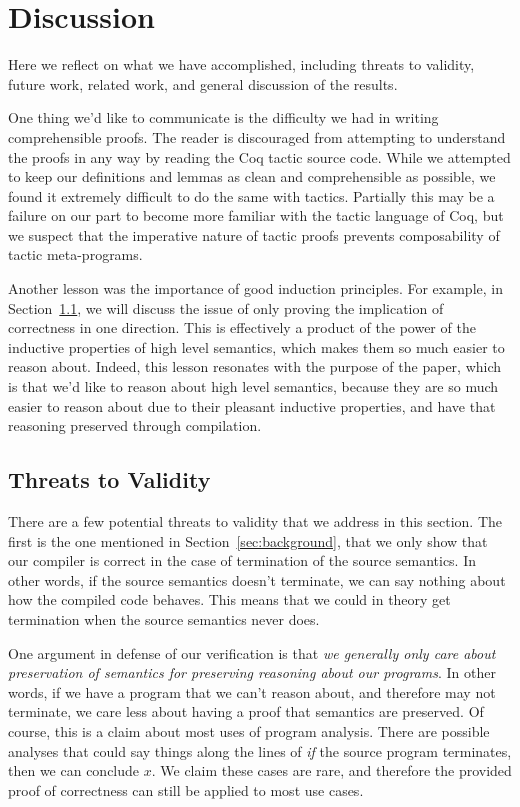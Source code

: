 \section{Discussion} \label{sec:discussion}

Here we reflect on what we have accomplished, including threats to validity,
future work, related work, and general discussion of the results.

One thing we'd like to communicate is the difficulty we had in writing
comprehensible proofs. The reader is discouraged from attempting to understand
the proofs in any way by reading the Coq tactic source code. While we attempted
to keep our definitions and lemmas as clean and comprehensible as possible, we
found it extremely difficult to do the same with tactics. Partially this may be
a failure on our part to become more familiar with the tactic language of Coq,
but we suspect that the imperative nature of tactic proofs prevents
composability of tactic meta-programs. 

Another lesson was the importance of good induction principles. For example, in
Section~\ref{sec:threats}, we will discuss the issue of only proving the
implication of correctness in one direction. This is effectively a product of
the power of the inductive properties of high level semantics, which makes them
so much easier to reason about. Indeed, this lesson resonates with the purpose
of the paper, which is that we'd like to reason about high level semantics,
because they are so much easier to reason about due to their pleasant inductive
properties, and have that reasoning preserved through compilation. 

\subsection{Threats to Validity} \label{sec:threats}

There are a few potential threats to validity that we address in this section. The
first is the one mentioned in Section~\ref{sec:background}, that we only show
that our compiler is correct in the case of termination of the source semantics.
In other words, if the source semantics doesn't terminate, we can say nothing
about how the compiled code behaves. This means that we could in theory get
termination when the source semantics never does. 

One argument in defense of our verification is that \emph{we generally only care
about preservation of semantics for preserving reasoning about our programs}. In
other words, if we have a program that we can't reason about, and therefore may
not terminate, we care less about having a proof that semantics are preserved.
Of course, this is a claim about most uses of program analysis. There are
possible analyses that could say things along the lines of \emph{if} the source
program terminates, then we can conclude $x$. We claim these cases are rare, and
therefore the provided proof of correctness can still be applied to most use
cases.  

